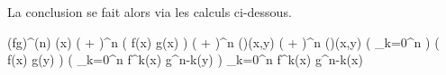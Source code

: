 La conclusion se fait alors via les calculs ci-dessous.

\begin{stepcalc}[style=sar]
	(fg)^{(n)} (x)
\explnext{}
    \big(  +  \big)^n \big( f(x) g(x) \big)
\explnext{}
    \big(  +  \big)^n \circ \Lambda(\pi)(x,y)
    \Lambda \circ \big(  +  \big)^n (\pi)(x,y)
\explnext{}
    \Lambda \circ \big( \dsum_{k=0}^n \combi[n][k]  \circ {} \big) \big( f(x) g(y) \big)
%
%
\explnext{}
    \Lambda \big( \dsum_{k=0}^n \combi[n][k] f^k(x) g^{n-k}(y) \big)
\explnext{}
	\dsum_{k=0}^n \combi[n][k] f^k(x) g^{n-k}(x)
\end{stepcalc}